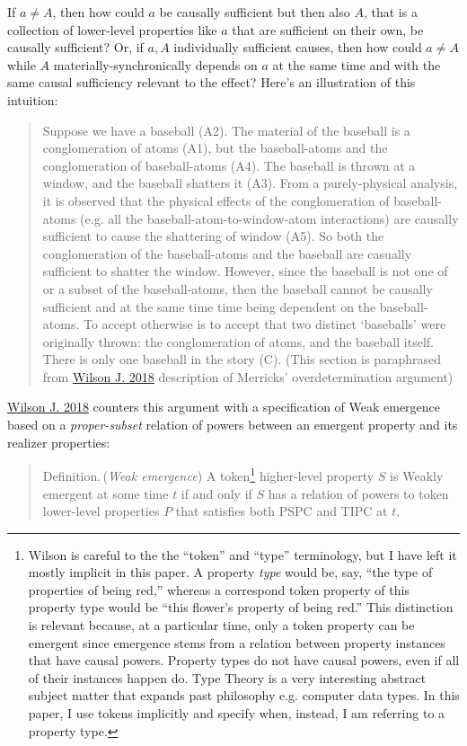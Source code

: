 \documentclass{article}
\newcommand{\ti}[1]{\textit{#1}}
\newcommand{\definition}{{\sc Definition.}\,}
\renewcommand{\cite}[1]{\hyperlink{#1}{#1}}
\begin{document}
If $a \neq A$, then how could $a$ be causally sufficient but then also $A$, that is a collection of lower-level properties like $a$ that are sufficient on their own, be causally sufficient? Or, if $a, A$ individually sufficient causes, then how could $a \neq A$ while $A$ materially-synchronically depends on $a$ at the same time and with the same causal sufficiency relevant to the effect? Here's an illustration of this intuition:

\begin{quote}
    Suppose we have a baseball (A2). The material of the baseball is a conglomeration of atoms (A1), but the baseball-atoms and the conglomeration of baseball-atoms (A4). The baseball is thrown at a window, and the baseball shatters it (A3). From a purely-physical analysis, it is observed that the physical effects of the conglomeration of baseball-atoms (e.g. all the baseball-atom-to-window-atom interactions) are causally sufficient to cause the shattering of window (A5). So both the conglomeration of the baseball-atoms and the baseball are casually sufficient to shatter the window. However, since the baseball is not one of or a subset of the baseball-atoms, then the baseball cannot be causally sufficient and at the same time time being dependent on the baseball-atoms. To accept otherwise is to accept that two distinct `baseballs' were originally thrown: the conglomeration of atoms, and the baseball itself. There is only one baseball in the story (C). (This section is paraphrased from \cite{Wilson J. 2018} description of Merricks' overdetermination argument)
\end{quote}

\cite{Wilson J. 2018} counters this argument with a specification of Weak emergence based on a \ti{proper-subset} relation of powers between an emergent property and its realizer properties:

\begin{quote}
\definition (\ti{Weak emergence}) A token\footnote{Wilson is careful to the the ``token'' and ``type'' terminology, but I have left it mostly implicit in this paper. A property \ti{type} would be, say, ``the type of properties of being red,'' whereas a correspond token property of this property type would be ``this flower's property of being red.'' This distinction is relevant because, at a particular time, only a token property can be emergent since emergence stems from a relation between property instances that have causal powers. Property types do not have causal powers, even if all of their instances happen do. Type Theory is a very interesting abstract subject matter that expands past philosophy e.g. computer data types. In this paper, I use tokens implicitly and specify when, instead, I am referring to a property type.} higher-level property $S$ is Weakly emergent at some time $t$ if and only if $S$ has a relation of powers to token lower-level properties $P$ that satisfies both PSPC and TIPC at $t$.
\end{quote}
\end{document}
